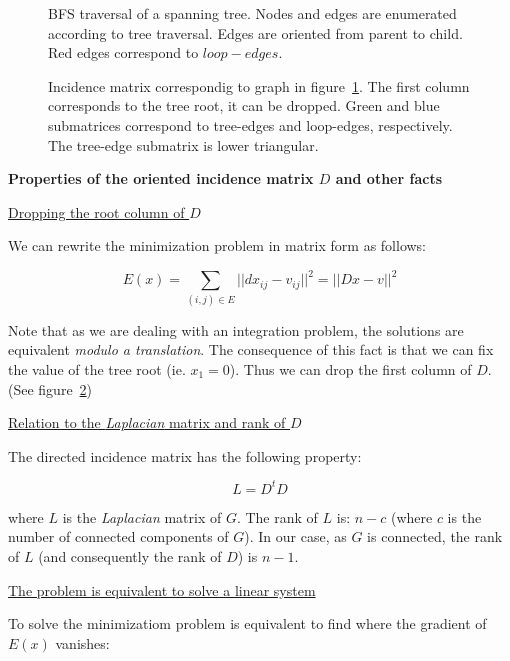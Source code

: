 \documentclass[a4paper,11pt]{article}
\begin{document}
\begin{figure}
\centering

\caption{BFS traversal of a spanning tree. Nodes and edges are 
enumerated according to tree traversal. Edges are oriented from 
parent to child. Red edges correspond to 
$loop-edges$.}
\label{fig:M1}
\end{figure}

\begin{figure}
\centering

\caption{Incidence matrix correspondig to graph in figure~\ref{fig:M1}. 
The first column corresponds to the tree root, it can be dropped. 
Green and blue submatrices correspond to tree-edges and loop-edges, 
respectively. The tree-edge submatrix is lower triangular.}
\label{fig:M2}
\end{figure}

\newpage

\textbf{Properties of the oriented incidence matrix $D$ and other facts}

\bigskip

\underline{Dropping the root column of $D$}

\bigskip

We can rewrite the minimization problem in matrix form as follows:

$$E(x) = \sum_{(i,j) \in E} ||dx_{ij} - v_{ij}||^2 = || D x - v||^2$$

Note that as we are dealing with an integration problem, the solutions 
are equivalent \textit{modulo a translation}. The consequence of this 
fact is that we can fix the value of the tree root (ie. $x_1 = 0$). 
Thus we can drop the first column of $D$. (See 
figure~\ref{fig:M2})

\bigskip

\underline{Relation to the \textit{Laplacian} matrix and rank of $D$}

\bigskip

The directed incidence matrix has the following property:

$$L = D^t D$$

where $L$ is the \textit{Laplacian} matrix of $G$. The rank of 
$L$ is: $n-c$ (where $c$ is the number of connected components of $G$). 
In our case, as $G$ is connected, the rank of $L$ (and consequently the 
rank of $D$) is $n-1$.

\bigskip

\underline{The problem is equivalent to solve a linear system}

\bigskip

To solve the minimizatiom problem is equivalent to find where the 
gradient of $E(x)$ vanishes:
 
\end{document}
